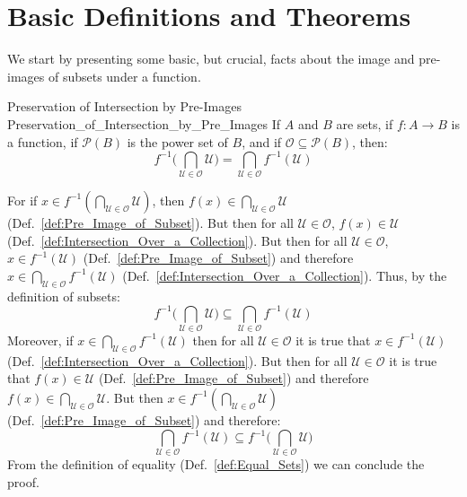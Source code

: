 \section{Basic Definitions and Theorems}
    We start by presenting some basic, but crucial, facts about the image and
    pre-images of subsets under a function.
    \begin{ftheorem}{Preservation of Intersection by Pre-Images}
                    {Preservation_of_Intersection_by_Pre_Images}
        If $A$ and $B$ are sets, if $f:A\rightarrow{B}$ is a function, if
        $\mathcal{P}(B)$ is the power set of $B$, and if
        $\mathcal{O}\subseteq\mathcal{P}(B)$, then:
        \begin{equation*}
            f^{\minus{1}}\Big(
                \bigcap_{\mathcal{U}\in\mathcal{O}}\mathcal{U}\Big)
            =\bigcap_{\mathcal{U}\in\mathcal{O}}f^{\minus{1}}(\mathcal{U})
        \end{equation*}
    \end{ftheorem}
    \begin{bproof}
        For if
        $x\in{f}^{\minus{1}}(\bigcap_{\mathcal{U}\in\mathcal{O}}\mathcal{U})$,
        then $f(x)\in\bigcap_{\mathcal{U}\in\mathcal{O}}\mathcal{U}$
        (Def.~\ref{def:Pre_Image_of_Subset}). But then for all
        $\mathcal{U}\in\mathcal{O}$, $f(x)\in\mathcal{U}$
        (Def.~\ref{def:Intersection_Over_a_Collection}). But then for all
        $\mathcal{U}\in\mathcal{O}$, $x\in{f}^{\minus{1}}(\mathcal{U})$
        (Def.~\ref{def:Pre_Image_of_Subset}) and therefore
        $x\in\bigcap_{\mathcal{U}\in\mathcal{O}}f^{\minus{1}}(\mathcal{U})$
        (Def.~\ref{def:Intersection_Over_a_Collection}). Thus, by the definition
        of subsets:
        \begin{equation}
            f^{\minus{1}}\Big(
                \bigcap_{\mathcal{U}\in\mathcal{O}}\mathcal{U}\Big)
            \subseteq\bigcap_{\mathcal{U}\in\mathcal{O}}
                f^{\minus{1}}(\mathcal{U})
        \end{equation}
        Moreover, if
        $x\in\bigcap_{\mathcal{U}\in\mathcal{O}}f^{\minus{1}}(\mathcal{U})$ then
        for all $\mathcal{U}\in\mathcal{O}$ it is true that
        $x\in{f}^{\minus{1}}(\mathcal{U})$
        (Def.~\ref{def:Intersection_Over_a_Collection}). But then for all
        $\mathcal{U}\in\mathcal{O}$ it is true that $f(x)\in\mathcal{U}$
        (Def.~\ref{def:Pre_Image_of_Subset}) and therefore
        $f(x)\in\bigcap_{\mathcal{U}\in\mathcal{O}}\mathcal{U}$. But then
        $x\in{f}^{\minus{1}}(\bigcap_{\mathcal{U}\in\mathcal{O}}\mathcal{U})$
        (Def.~\ref{def:Pre_Image_of_Subset}) and therefore:
        \begin{equation}
            \bigcap_{\mathcal{U}\in\mathcal{O}}f^{\minus{1}}(\mathcal{U})
            \subseteq{f}^{\minus{1}}\Big(
                \bigcap_{\mathcal{U}\in\mathcal{O}}\mathcal{U}\Big)
        \end{equation}
        From the definition of equality
        (Def.~\ref{def:Equal_Sets}) we can conclude the proof.
    \end{bproof}
